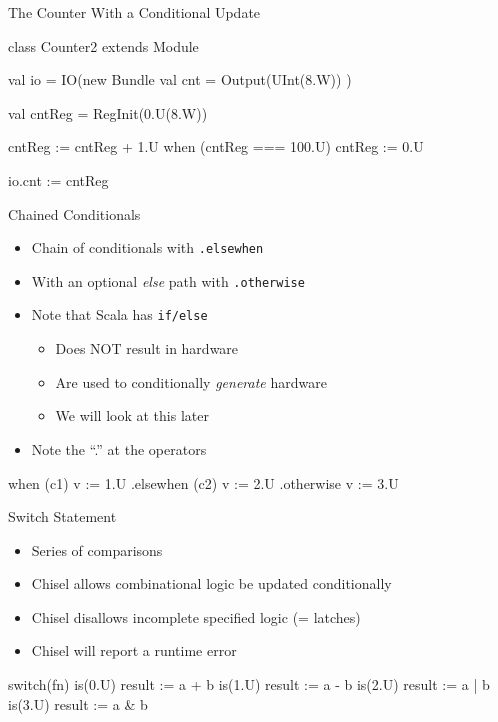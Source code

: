 \documentclass[xcolor=pdflatex,dvipsnames,table]{beamer}
\newcommand{\code}[1]{{\texttt{#1}}}
\begin{document}
\begin{frame}[fragile]{The Counter With a Conditional Update}
\begin{chisel}
class Counter2 extends Module {
  val io = IO(new Bundle {
    val cnt = Output(UInt(8.W))
  })

  val cntReg = RegInit(0.U(8.W))

  cntReg := cntReg + 1.U
  when (cntReg === 100.U) {
    cntReg := 0.U
  }

  io.cnt := cntReg
}
\end{chisel}
\end{frame}

\begin{frame}[fragile]{Chained Conditionals}
\begin{itemize}
\item Chain of conditionals with \code{.elsewhen}
\item With an optional \emph{else} path with \code{.otherwise}
\item Note that Scala has \code{if/else}
\begin{itemize}
\item Does NOT result in hardware
\item Are used to conditionally \emph{generate} hardware
\item We will look at this later
\end{itemize}
\item Note the ``.'' at the operators
\end{itemize}
\begin{chisel}
  when (c1) { v := 1.U }
  .elsewhen (c2) { v := 2.U }
  .otherwise { v := 3.U }
\end{chisel}
\end{frame}

\begin{frame}[fragile]{Switch Statement}
\begin{itemize}
\item Series of comparisons
\item Chisel allows combinational logic be updated conditionally 
\item Chisel disallows incomplete specified logic (= latches)
\item Chisel will report a runtime error
\end{itemize}
\begin{chisel}
  switch(fn) {
    is(0.U) { result := a + b }
    is(1.U) { result := a - b }
    is(2.U) { result := a | b }
    is(3.U) { result := a & b }
  }
\end{chisel}
\end{frame}
\end{document}
